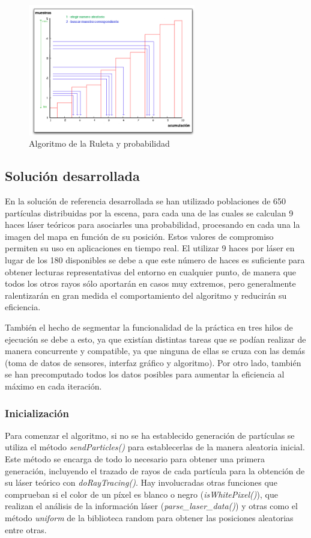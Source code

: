 \begin{figure}[H]
\begin{center}
	\includegraphics[width=0.65\textwidth]{figures/pacruleta.png}
	\caption{Algoritmo de la Ruleta y probabilidad}
	\label{fig.pacruleta}
	\end{center}
\end{figure}

\subsection{Solución desarrollada}
En la solución de referencia desarrollada se han utilizado poblaciones de 650 partículas distribuidas por la escena, para cada una de las cuales se calculan 9 haces láser teóricos para asociarles una probabilidad, procesando en cada una la imagen del mapa en función de su posición. Estos valores de compromiso permiten su uso en aplicaciones en tiempo real. El utilizar 9 haces por láser en lugar de los 180 disponibles se debe a que este número de haces es suficiente para obtener lecturas representativas del entorno en cualquier punto, de manera que todos los otros rayos sólo aportarán en casos muy extremos, pero generalmente ralentizarán en gran medida el comportamiento del algoritmo y reducirán su eficiencia. 

También el hecho de segmentar la funcionalidad de la práctica en tres hilos de ejecución se debe a esto, ya que existían distintas tareas que se podían realizar de manera concurrente y compatible, ya que ninguna de ellas se cruza con las demás (toma de datos de sensores, interfaz gráfico y algoritmo).
Por otro lado, también se han precomputado todos los datos posibles para aumentar la eficiencia al máximo en cada iteración.

\subsubsection{Inicialización}
Para comenzar el algoritmo, si no se ha establecido generación de partículas se utiliza el método \textit{sendParticles()} para establecerlas de la manera aleatoria inicial. Este método se encarga de todo lo necesario para obtener una primera generación, incluyendo el trazado de rayos de cada partícula para la obtención de su láser teórico con \textit{doRayTracing()}. Hay involucradas otras funciones que comprueban si el color de un píxel es blanco o negro (\textit{isWhitePixel()}), que realizan el análisis de la información láser (\textit{parse\_laser\_data()}) y otras como el método \textit{uniform} de la biblioteca random para obtener las posiciones aleatorias entre otras.

